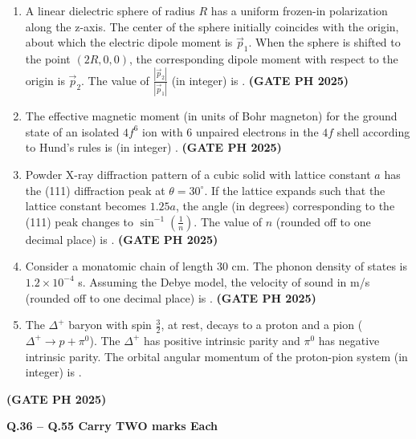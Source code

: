 \documentclass[14pt, a4paper]{extarticle}
\renewcommand{\vec}[1]{\overrightarrow{#1}}
\begin{document}
\begin{enumerate}[label=\textbf{Q.\arabic*}]
\item A linear dielectric sphere of radius $R$ has a uniform frozen-in polarization along the z-axis. The center of the sphere initially coincides with the origin, about which the electric dipole moment is $\vec{p}_1$. When the sphere is shifted to the point $(2R, 0, 0)$, the corresponding dipole moment with respect to the origin is $\vec{p}_2$. The value of $\frac{|\vec{p}_2|}{|\vec{p}_1|}$ (in integer) is \underline{\hspace{3cm}}.
\hfill \textbf{(GATE PH 2025)}

\item The effective magnetic moment (in units of Bohr magneton) for the ground state of an isolated $4f^6$ ion with 6 unpaired electrons in the $4f$ shell according to Hund's rules is (in integer) \underline{\hspace{3cm}}.
\hfill \textbf{(GATE PH 2025)}

\item Powder X-ray diffraction pattern of a cubic solid with lattice constant $a$ has the (111) diffraction peak at $\theta = 30^{\circ}$. If the lattice expands such that the lattice constant becomes $1.25a$, the angle (in degrees) corresponding to the (111) peak changes to $\sin^{-1}\left(\frac{1}{n}\right)$. The value of $n$ (rounded off to one decimal place) is \underline{\hspace{3cm}}.
\hfill \textbf{(GATE PH 2025)}

\item Consider a monatomic chain of length 30 cm. The phonon density of states is $1.2 \times 10^{-4}$ s. Assuming the Debye model, the velocity of sound in m/s (rounded off to one decimal place) is \underline{\hspace{3cm}}.
\hfill \textbf{(GATE PH 2025)}

\item The $\Delta^+$ baryon with spin $\frac{3}{2}$, at rest, decays to a proton and a pion ($\Delta^+ \to p + \pi^0$). The $\Delta^+$ has positive intrinsic parity and $\pi^0$ has negative intrinsic parity. The orbital angular momentum of the proton-pion system (in integer) is \underline{\hspace{3cm}}.
\end{enumerate}
\hfill \textbf{(GATE PH 2025)}

\textbf{Q.36 – Q.55 Carry TWO marks Each}
\end{document}
